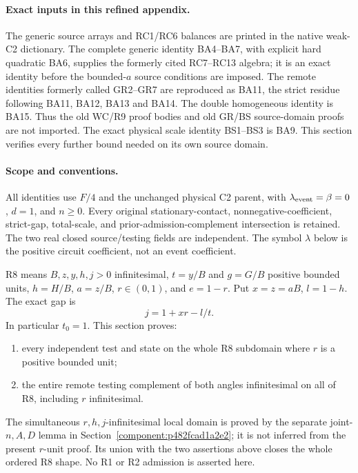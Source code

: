 \paragraph{Exact inputs in this refined appendix.}
The generic source arrays and RC1/RC6 balances are printed in the native
weak-C2 dictionary. The complete generic identity BA4--BA7, with explicit
hard quadratic BA6, supplies the formerly cited RC7--RC13 algebra; it is
an exact identity before the bounded-$a$ source conditions are imposed.
The remote identities formerly called GR2--GR7 are reproduced as BA11,
the strict residue following BA11, BA12, BA13 and BA14. The double
homogeneous identity is BA15. Thus the old WC/R9 proof bodies and old
GR/BS source-domain proofs are not imported. The exact physical scale
identity BS1--BS3 is BA9. This section verifies every further bound
needed on its own source domain.

\label{pe07041e033da:sec:r17-R8-joint-D}

\paragraph{Scope and conventions.}
All identities use $F/4$ and the unchanged physical C2 parent, with
$\lambda_{\rm event}=\beta=0$, $d=1$, and $n\ge0$.  Every original
stationary-contact, nonnegative-coefficient, strict-gap, total-scale,
and prior-admission-complement intersection is retained.  The two real
closed source/testing fields are independent.  The symbol $\lambda$
below is the positive circuit coefficient, not an event coefficient.

R8 means $B,z,y,h,j>0$ infinitesimal, $t=y/B$ and $g=G/B$ positive
bounded units, $h=H/B$, $a=z/B$, $r\in(0,1)$, and $e=1-r$.  Put
$x=z=aB$, $l=1-h$.  The exact gap is
\[
                 j=1+xr-l/t.                         \tag{JD1}
\]
In particular $t_0=1$.  This section proves:
\begin{enumerate}
\item every independent test and state on the whole R8 subdomain
      where $r$ is a positive bounded unit;
\item the entire remote testing complement of both angles
      infinitesimal on all of R8, including $r$ infinitesimal.
\end{enumerate}
The simultaneous $r,h,j$-infinitesimal local domain is proved by the
separate joint-$n,A,D$ lemma in
Section~\ref{component:p482fcad1a2e2}; it is not
inferred from the present $r$-unit proof.  Its union with the two
assertions above closes the whole ordered R8 shape.  No R1 or R2
admission is asserted here.

